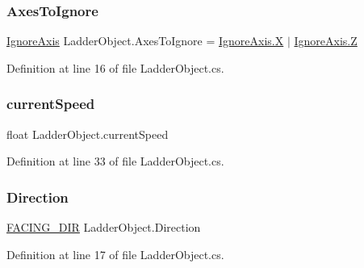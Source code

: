 \subsubsection{\texorpdfstring{Axes\+To\+Ignore}{AxesToIgnore}}
{\footnotesize\ttfamily \mbox{\hyperlink{_ignore_axis_8cs_aa61b0141055d583a4f5b013297a1d48f}{Ignore\+Axis}} Ladder\+Object.\+Axes\+To\+Ignore = \mbox{\hyperlink{_ignore_axis_8cs_aa61b0141055d583a4f5b013297a1d48fa02129bb861061d1a052c592e2dc6b383}{Ignore\+Axis.\+X}} $\vert$ \mbox{\hyperlink{_ignore_axis_8cs_aa61b0141055d583a4f5b013297a1d48fa21c2e59531c8710156d34a3c30ac81d5}{Ignore\+Axis.\+Z}}}



Definition at line 16 of file Ladder\+Object.\+cs.

\mbox{\label{class_ladder_object_acc99f7b844cc4eb9c9147a6bdf09f086}} 
\subsubsection{\texorpdfstring{current\+Speed}{currentSpeed}}
{\footnotesize\ttfamily float Ladder\+Object.\+current\+Speed}



Definition at line 33 of file Ladder\+Object.\+cs.

\mbox{\label{class_ladder_object_a6f93daf035514b3c105c31a7a1351be7}} 
\subsubsection{\texorpdfstring{Direction}{Direction}}
{\footnotesize\ttfamily \mbox{\hyperlink{_animal_8cs_a57d10208ebba781ae206546ada2002b6}{F\+A\+C\+I\+N\+G\+\_\+\+D\+IR}} Ladder\+Object.\+Direction}



Definition at line 17 of file Ladder\+Object.\+cs.

\mbox{\label{class_ladder_object_a4ffcf3a6cc34dd6a74d0b0c72c06915f}} 
